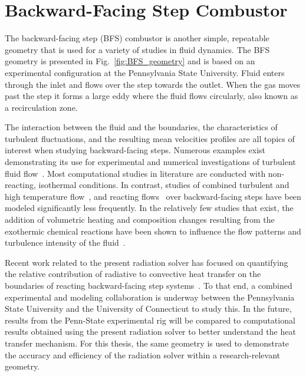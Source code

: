 \section{Backward-Facing Step Combustor}\label{section:BFS}
The backward-facing step (BFS) combustor is another simple, repeatable geometry that is used for a variety of studies in fluid dynamics. 
The BFS geometry is presented in Fig.~\ref{fig:BFS_geometry} and is based on an experimental configuration at the Pennsylvania State University.
Fluid enters through the inlet and flows over the step towards the outlet. When the gas moves past the step it forms a large eddy where the fluid flows circularly, also known as a recirculation zone. 

The interaction between the fluid and the boundaries, the characteristics of turbulent fluctuations, and the resulting mean velocities profiles are all topics of interest when studying backward-facing steps. 
Numerous examples exist demonstrating its use for experimental and numerical investigations of turbulent fluid flow~\cite{Armaly1983ExperimentalFlow,Neto1993AStep,Jovic1994Backward-facing5000,Le1997DirectStep}. 
Most computational studies in literature are conducted with non-reacting, isothermal conditions.
In contrast, studies of combined turbulent and high temperature flow~\cite{Niemann2016Buoyancy-affectedNumber,Xie2017GeometrySteps}, and reacting flows~\cite{Pouech2021PremixedStep} over backward-facing steps have been modeled significantly less frequently.
In the relatively few studies that exist, the addition of volumetric heating and composition changes resulting from the exothermic chemical reactions have been shown to influence the flow patterns and turbulence intensity of the fluid~\cite{Pouech2021PremixedStep}. 

Recent work related to the present radiation solver has focused on quantifying the relative contribution of radiative to convective heat transfer on the boundaries of reacting backward-facing step systems~\cite{Colborn2023VariationCombustor}.
To that end, a combined experimental and modeling collaboration is underway between the Pennsylvania State University and the University of Connecticut to study this. In the future, results from the Penn-State experimental rig will be compared to computational results obtained using the present radiation solver to better understand the heat transfer mechanism. For this thesis, the same geometry is used to demonstrate the accuracy and efficiency of the radiation solver within a research-relevant geometry.

